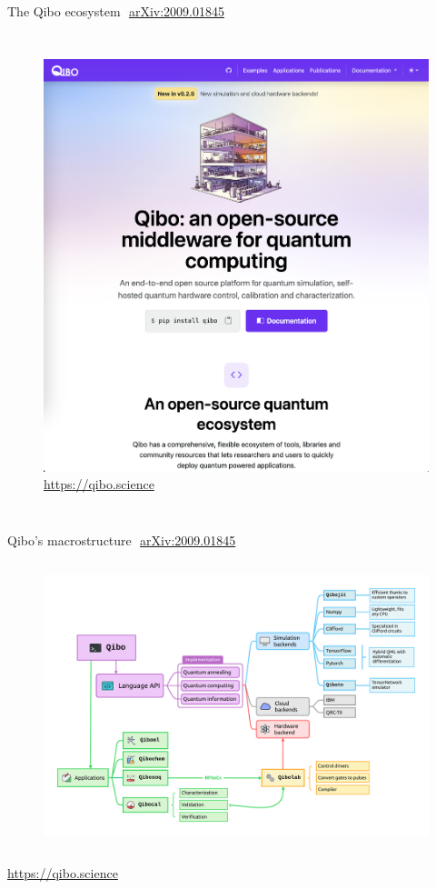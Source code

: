 \documentclass[aspectratio=169, 8pt, xcolor={svgnames}, hyperref={linkcolor=black}]{beamer}
\begin{document}
\begin{frame}{The Qibo ecosystem\hfill \faBook\,\, \href{https://arxiv.org/abs/2009.01845}{arXiv:2009.01845}}
\begin{columns}
     \column{5cm}
     \begin{figure}
       \includegraphics[width=\textwidth]{figures/docs.png}
       {\color{blue}\url{https://qibo.science}}
     \end{figure}
   \end{columns}
\end{frame}

 \begin{frame}{Qibo's macrostructure\hfill \faBook\,\, \href{https://arxiv.org/abs/2009.01845}{arXiv:2009.01845}}
   \vspace{-0.27cm}
   \begin{figure}
     \includegraphics[height=8.3cm]{figures/qibo_ecosystem.pdf}
   \end{figure}
   \vspace{-1.3cm}
   \hfill{\footnotesize \color{blue}\url{https://qibo.science}}
 \end{frame}
\end{document}
